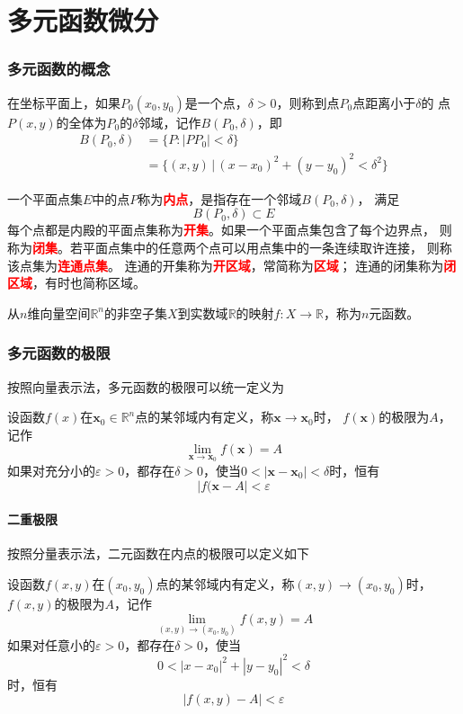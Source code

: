 \part{多元函数微分}
\section{多元函数的概念}
在坐标平面上，如果$P_0(x_0,y_0)$是一个点，$\delta > 0$，则称到点$P_0$点距离小于$\delta$的
点$P(x,y)$的全体为$P_0$的$\delta$邻域，记作$B(P_0,\delta)$，即
\begin{align*}
    B(P_0,\delta) & = \{P:|PP_0|<\delta\}                              \\
                  & = \{(x,y)\,|\, (x-x_0)^2 + (y-y_0)^2 < \delta^2 \}
\end{align*}

一个平面点集$E$中的点$P$称为\textcolor{red}{\textbf{\textsf{内点}}}，是指存在一个邻域$B(P_0,\delta)$，
满足
\[ B(P_0,\delta) \subset E \]
每个点都是内殿的平面点集称为\textcolor{red}{\textbf{\textsf{开集}}}。如果一个平面点集包含了每个边界点，
则称为\textcolor{red}{\textbf{\textsf{闭集}}}。若平面点集中的任意两个点可以用点集中的一条连续取许连接，
则称该点集为\textcolor{red}{\textbf{\textsf{连通点集}}}。
连通的开集称为\textcolor{red}{\textbf{\textsf{开区域}}}，常简称为\textcolor{red}{\textbf{\textsf{区域}}}；
连通的闭集称为\textcolor{red}{\textbf{\textsf{闭区域}}}，有时也简称区域。

从$n$维向量空间$\mathbb{R}^n$的非空子集$X$到实数域$\mathbb{R}$的映射$f:X\to \mathbb{R}$，称为$n$元函数。

\section{多元函数的极限}
按照向量表示法，多元函数的极限可以统一定义为
\begin{definition}
    设函数$f(x)$在$\bm{x}_0\in\mathbb{R}^n$点的某邻域内有定义，称$\bm{x}\to\bm{x}_0$时，
    $f(\bm{x})$的极限为$A$，记作
    \[ \lim_{\bm{x}\to\bm{x}_0}f(\bm{x})=A \]
    如果对充分小的$\varepsilon>0$，都存在$\delta>0$，使当$0<|\bm{x}-\bm{x}_0|<\delta$时，恒有
    \[ |f(\bm{x}-A|<\varepsilon \]
\end{definition}

\subsection{二重极限}
按照分量表示法，二元函数在内点的极限可以定义如下
\begin{definition}
    设函数$f(x,y)$在$(x_0,y_0)$点的某邻域内有定义，称$(x,y)\to(x_0,y_0)$时，$f(x,y)$的极限为$A$，记作
    \[ \lim_{(x,y)\to(x_0,y_0)} f(x,y) = A \]
    如果对任意小的$\varepsilon>0$，都存在$\delta>0$，使当
    \[ 0<|x-x_0|^2 +|y-y_0|^2<\delta \]
    时，恒有
    \[ |f(x,y)-A| < \varepsilon \]
\end{definition}

